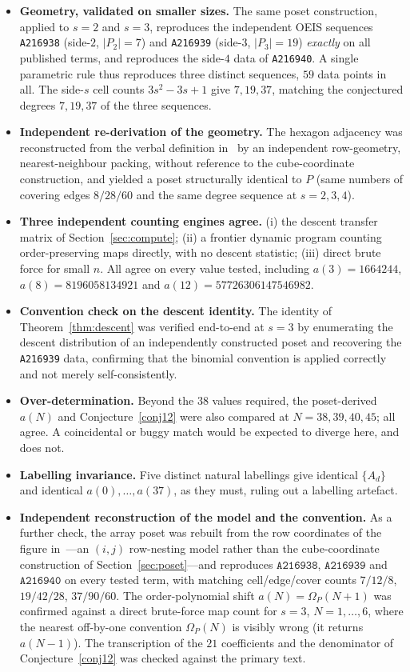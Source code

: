 \documentclass[11pt]{article}
\theoremstyle{plain}
\theoremstyle{definition}
\theoremstyle{remark}
\newcommand{\OEIS}[1]{\texttt{#1}}
\newcommand{\Om}{\Omega}
\begin{document}
\begin{itemize}[leftmargin=1.4em]
  \item \textbf{Geometry, validated on smaller sizes.} The same poset construction, applied to
  $s=2$ and $s=3$, reproduces the independent OEIS sequences \OEIS{A216938} (side-$2$,
  $|P_2|=7$) and \OEIS{A216939} (side-$3$, $|P_3|=19$) \emph{exactly} on all published terms,
  and reproduces the side-$4$ data of \OEIS{A216940}. A single parametric rule thus reproduces
  three distinct sequences, $59$ data points in all. The side-$s$ cell counts $3s^2-3s+1$ give
  $7,19,37$, matching the conjectured degrees $7,19,37$ of the three sequences.
  \item \textbf{Independent re-derivation of the geometry.} The hexagon adjacency was
  reconstructed from the verbal definition in~\cite[\S5.1]{KK23} by an independent
  row-geometry, nearest-neighbour packing, without reference to the cube-coordinate
  construction, and yielded a poset structurally identical to $P$ (same numbers of covering
  edges $8/28/60$ and the same degree sequence at $s=2,3,4$).
  \item \textbf{Three independent counting engines agree.} (i) the descent transfer matrix of
  Section~\ref{sec:compute}; (ii) a frontier dynamic program counting order-preserving maps
  directly, with no descent statistic; (iii) direct brute force for small $n$. All agree on
  every value tested, including $a(3)=1664244$, $a(8)=8196058134921$ and
  $a(12)=57726306147546982$.
  \item \textbf{Convention check on the descent identity.} The identity of
  Theorem~\ref{thm:descent} was verified end-to-end at $s=3$ by enumerating the descent
  distribution of an independently constructed poset and recovering the \OEIS{A216939} data,
  confirming that the binomial convention is applied correctly and not merely
  self-consistently.
  \item \textbf{Over-determination.} Beyond the $38$ values required, the poset-derived $a(N)$
  and Conjecture~\ref{conj12} were also compared at $N=38,39,40,45$; all agree. A coincidental
  or buggy match would be expected to diverge here, and does not.
  \item \textbf{Labelling invariance.} Five distinct natural labellings give identical
  $\{A_d\}$ and identical $a(0),\dots,a(37)$, as they must, ruling out a labelling artefact.
  \item \textbf{Independent reconstruction of the model and the convention.} As a further check,
  the array poset was rebuilt from the row coordinates of the figure in~\cite[\S5.1]{KK23}---an
  $(i,j)$ row-nesting model rather than the cube-coordinate construction of
  Section~\ref{sec:poset}---and reproduces $\OEIS{A216938}$, $\OEIS{A216939}$ and $\OEIS{A216940}$
  on every tested term, with matching cell/edge/cover counts $7/12/8$, $19/42/28$, $37/90/60$.
  The order-polynomial shift $a(N)=\Om_P(N+1)$ was confirmed against a direct brute-force map
  count for $s=3$, $N=1,\dots,6$, where the nearest off-by-one convention $\Om_P(N)$ is visibly
  wrong (it returns $a(N-1)$). The transcription of the $21$ coefficients and the denominator of
  Conjecture~\ref{conj12} was checked against the primary text.
\end{itemize}
\end{document}
